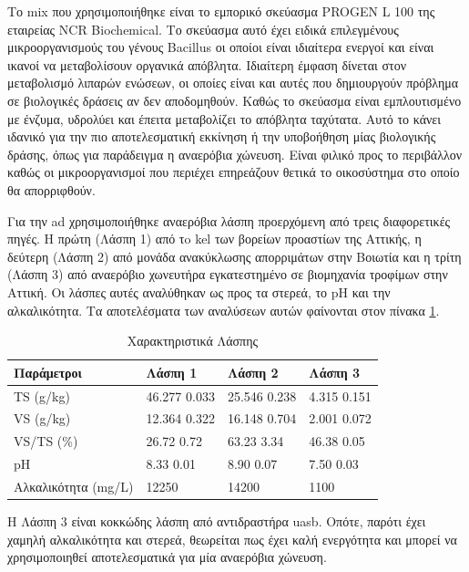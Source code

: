 \documentclass[11pt]{report}
\begin{document}
Το \acrfull{mix} που χρησιμοποιήθηκε είναι το εμπορικό σκεύασμα PROGEN L 100 της εταιρείας NCR Biochemical. Το σκεύασμα αυτό έχει ειδικά επιλεγμένους μικροοργανισμούς του γένους Bacillus οι οποίοι είναι ιδιαίτερα ενεργοί και είναι ικανοί να μεταβολίσουν οργανικά απόβλητα. Ιδιαίτερη έμφαση δίνεται στον μεταβολισμό λιπαρών ενώσεων, οι οποίες είναι και αυτές που δημιουργούν πρόβλημα σε βιολογικές δράσεις αν δεν αποδομηθούν. Καθώς το σκεύασμα είναι εμπλουτισμένο με ένζυμα, υδρολύει και έπειτα μεταβολίζει το απόβλητα ταχύτατα. Αυτό το κάνει ιδανικό για την πιο αποτελεσματική εκκίνηση ή την υποβοήθηση μίας βιολογικής δράσης, όπως για παράδειγμα η αναερόβια χώνευση. Είναι φιλικό προς το περιβάλλον καθώς οι μικροοργανισμοί που περιέχει επηρεάζουν θετικά το οικοσύστημα στο οποίο θα απορριφθούν.

Για την \acrshort{ad} χρησιμοποιήθηκε αναερόβια λάσπη προερχόμενη από τρεις διαφορετικές πηγές. Η πρώτη (Λάσπη 1) από τo \acrfull{kel} των βορείων προαστίων της Αττικής, η δεύτερη (Λάσπη 2) από μονάδα ανακύκλωσης απορριμάτων στην Βοιωτία και η τρίτη (Λάσπη 3) από αναερόβιο χωνευτήρα εγκατεστημένο σε βιομηχανία τροφίμων στην Αττική. Οι λάσπες αυτές αναλύθηκαν ως προς τα στερεά, το pH και την αλκαλικότητα. Τα αποτελέσματα των αναλύσεων αυτών φαίνονται στον πίνακα \ref{tab:orgb9a5457}. 

\begin{table}[htbp]
\caption{\label{tab:orgb9a5457}Χαρακτηριστικά Λάσπης}
\centering
\begin{tabular}{llll}
Παράμετροι & Λάσπη 1 & Λάσπη 2 & Λάσπη 3\\[0pt]
\hline
TS (g/kg) & 46.277 \textpm{} 0.033 & 25.546 \textpm{} 0.238 & 4.315 \textpm{} 0.151\\[0pt]
VS (g/kg) & 12.364 \textpm{} 0.322 & 16.148 \textpm{} 0.704 & 2.001 \textpm{} 0.072\\[0pt]
VS/TS (\%) & 26.72 \textpm{} 0.72 & 63.23 \textpm{} 3.34 & 46.38 \textpm{} 0.05\\[0pt]
pH & 8.33 \textpm{} 0.01 & 8.90 \textpm{} 0.07 & 7.50 \textpm{} 0.03\\[0pt]
Αλκαλικότητα (mg/L) & 12250 & 14200 & 1100\\[0pt]
\end{tabular}
\end{table}

Η Λάσπη 3 είναι κοκκώδης λάσπη από αντιδραστήρα \acrshort{uasb}. Οπότε, παρότι έχει χαμηλή αλκαλικότητα και στερεά, θεωρείται πως έχει καλή ενεργότητα και μπορεί να χρησιμοποιηθεί αποτελεσματικά για μία αναερόβια χώνευση.
\end{document}
